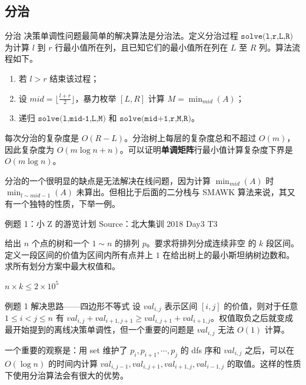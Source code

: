 \documentclass{beamer}
\begin{document}
\subsection{分治}
\begin{frame}{分治}
	决策单调性问题最简单的解决算法是分治法。定义分治过程 $\texttt{solve(l,r,L,R)}$ 为计算 $l$ 到 $r$ 行最小值所在列，且已知它们的最小值所在列在 $L$ 至 $R$ 列。算法流程如下。
	\begin{enumerate}
		\item 若 $l>r$ 结束该过程；
		\item 设 $mid = \lfloor \frac{l+r}{2} \rfloor$，暴力枚举 $[L,R]$ 计算 $M=\min_{mid}(A)$；
		\item 递归 $\texttt{solve(l,mid-1,L,M)}$ 和 $\texttt{solve(mid+1,r,M,R)}$。
	\end{enumerate}\pause
	每次分治的复杂度是 $O(R-L)$。分治树上每层的复杂度总和不超过 $O(m)$，因此复杂度为 $O(m \log n + n)$。可以证明\textbf{单调矩阵}行最小值计算复杂度下界是 $O(m \log n)$。
	
	分治的一个很明显的缺点是无法解决在线问题，因为计算 $\min_{mid}(A)$ 时 $\min_{l \sim mid-1}(A)$ 未算出。但相比于后面的二分栈与 SMAWK 算法来说，其又有一个独特的性质，下举一例。
\end{frame}
\begin{frame}{例题 1：小 Z 的游览计划}
Source：北大集训 2018 Day3 T3

给出 $n$ 个点的树和一个 $1 \sim n$ 的排列 $p$。要求将排列分成连续非空
的 $k$ 段区间。定义一段区间的价值为区间内所有点并上 $1$ 在给出树上的最小斯坦纳树边数和。求所有划分方案中最大权值和。

$n \times k \leq 2 \times 10^5$
\end{frame}
\begin{frame}{例题 1 解决思路——四边形不等式}
设 $val_{i,j}$ 表示区间 $[i,j]$ 的价值，则对于任意 $1 \leq i < j \leq n$ 有 $val_{i,j}+val_{i+1,j+1} \geq val_{i,j+1}+val_{i+1,j}$。权值取负之后就变成最开始提到的离线决策单调性，但一个重要的问题是 $val_{i,j}$ 无法 $O(1)$ 计算。\pause

一个重要的观察是：用 set 维护了 $p_i,p_{i+1},\cdots,p_j$ 的 dfs 序和 $val_{i,j}$ 之后，可以在 $O(\log n)$ 的时间内计算 $val_{i,j-1},val_{i,j+1},val_{i+1,j},val_{i-1,j}$ 的取值。这样的性质下使用分治算法会有很大的优势。
\end{frame}
\end{document}
